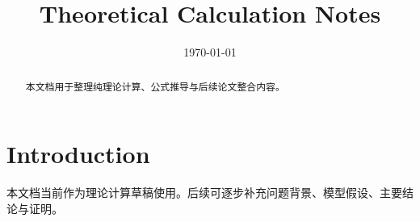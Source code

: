 \documentclass[UTF8,a4paper,11pt]{ctexart}
\title{Theoretical Calculation Notes}
\author{}
\date{\today}
\begin{document}
\maketitle

\begin{abstract}
本文档用于整理纯理论计算、公式推导与后续论文整合内容。
\end{abstract}

\tableofcontents

\section{Introduction}

本文档当前作为理论计算草稿使用。后续可逐步补充问题背景、模型假设、主要结论与证明。





\end{document}
